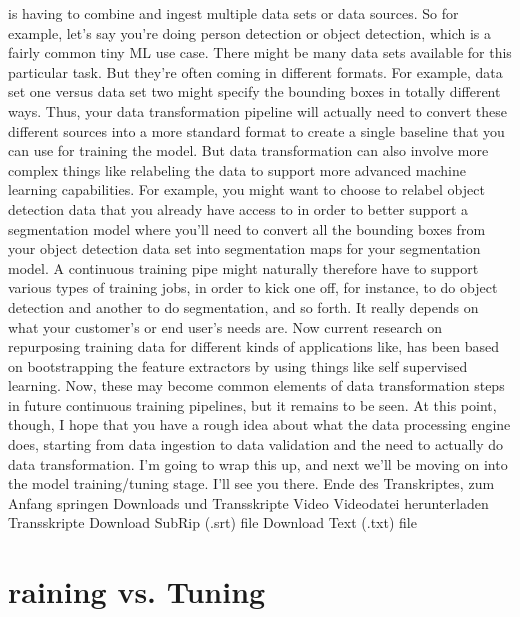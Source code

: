 {{{{    is having to combine and ingest multiple data sets or data sources.
    So for example, let's say you're doing person detection or object
    detection, which is a fairly common tiny ML use case.
    There might be many data sets available for this particular task.
    But they're often coming in different formats.
    For example, data set one versus data set
    two might specify the bounding boxes in totally different ways.
    Thus, your data transformation pipeline will actually
    need to convert these different sources into a more standard format
    to create a single baseline that you can use for training the model.
    But data transformation can also involve more complex things
    like relabeling the data to support more advanced machine learning capabilities.
    For example, you might want to choose to relabel object detection data
    that you already have access to in order to better support a segmentation model
    where you'll need to convert all the bounding boxes from your object
    detection data set into segmentation maps for your segmentation model.
    A continuous training pipe might naturally therefore
    have to support various types of training jobs,
    in order to kick one off, for instance, to do object detection and another
    to do segmentation, and so forth.
    It really depends on what your customer's or end user's needs are.
    Now current research on repurposing training data
    for different kinds of applications like,
    has been based on bootstrapping the feature extractors by using things
    like self supervised learning.
    Now, these may become common elements of data transformation steps
    in future continuous training pipelines, but it remains to be seen.
    At this point, though, I hope that you have
    a rough idea about what the data processing engine does,
    starting from data ingestion to data validation and the need
    to actually do data transformation.
    I'm going to wrap this up, and next we'll
    be moving on into the model training/tuning stage.
    I'll see you there.
    Ende des Transkriptes, zum Anfang springen
    Downloads und Transskripte
    Video
    Videodatei herunterladen
    Transskripte
    Download SubRip (.srt) file
    Download Text (.txt) file 
 
 \section{raining vs. Tuning}
 

}}}}
